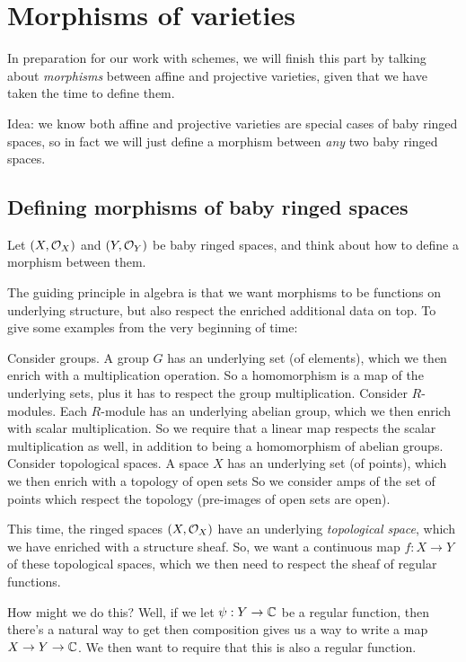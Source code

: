 \chapter{Morphisms of varieties}
In preparation for our work with schemes,
we will finish this part by talking about \emph{morphisms}
between affine and projective varieties,
given that we have taken the time to define them.

Idea: we know both affine and projective varieties are special
cases of baby ringed spaces, so in fact we will just define a morphism
between \emph{any} two baby ringed spaces.

\section{Defining morphisms of baby ringed spaces}
Let $(X, \mathcal O_X)$ and $(Y, \mathcal O_Y)$ be baby ringed spaces, and think
about how to define a morphism between them.

The guiding principle in algebra is that we want morphisms
to be functions on underlying structure, but also respect
the enriched additional data on top.
To give some examples from the very beginning of time:
\begin{example}
	\listhack
	\begin{itemize}
	\ii Consider groups.
	A group $G$ has an underlying set (of elements),
	which we then enrich with a multiplication operation.
	So a homomorphism is a map of the underlying sets,
	plus it has to respect the group multiplication.
	\ii Consider $R$-modules.
	Each $R$-module has an underlying abelian group,
	which we then enrich with scalar multiplication.
	So we require that a linear map respects the scalar multiplication as well,
	in addition to being a homomorphism of abelian groups.
	\ii Consider topological spaces.
	A space $X$ has an underlying set (of points),
	which we then enrich with a topology of open sets
	So we consider amps of the set of points
	which respect the topology (pre-images of open sets are open).
	\end{itemize}
\end{example}
This time, the ringed spaces $(X, \mathcal O_X)$ have an underlying
\emph{topological space}, which we have enriched with a structure sheaf.
So, we want a continuous map $f : X \to Y$ of these topological spaces,
which we then need to respect the sheaf of regular functions.

How might we do this? Well, if we let $\psi : Y \to \mathbb C$
be a regular function, then there's a natural way to get
then composition gives us a way to write a map $X \to Y \to \mathbb C$.
We then want to require that this is also a regular function.

